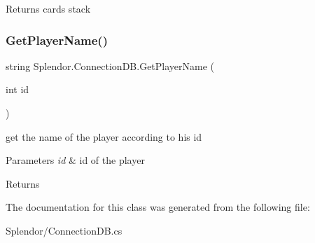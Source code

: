 \begin{DoxyReturn}{Returns}
cards stack
\end{DoxyReturn}
\mbox{\label{class_splendor_1_1_connection_d_b_a7d715d5452049ad06f4a407fa5df151c}} 
\subsubsection{\texorpdfstring{Get\+Player\+Name()}{GetPlayerName()}}
{\footnotesize\ttfamily string Splendor.\+Connection\+D\+B.\+Get\+Player\+Name (\begin{DoxyParamCaption}\item[{int}]{id }\end{DoxyParamCaption})}



get the name of the player according to his id 


\begin{DoxyParams}{Parameters}
{\em id} & id of the player\\
\hline
\end{DoxyParams}
\begin{DoxyReturn}{Returns}

\end{DoxyReturn}


The documentation for this class was generated from the following file\+:\begin{DoxyCompactItemize}
\item 
Splendor/Connection\+D\+B.\+cs\end{DoxyCompactItemize}
